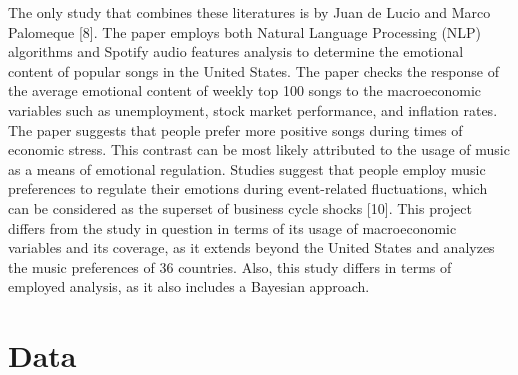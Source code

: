 \documentclass[12pt]{article}
\begin{document}
The only study that combines these literatures is by Juan de Lucio and Marco Palomeque [8]. The paper employs both Natural Language Processing (NLP) algorithms and Spotify audio features analysis to determine the emotional content of popular songs in the United States. The paper checks the response of the average emotional content of weekly top 100 songs to the macroeconomic variables such as unemployment, stock market performance, and inflation rates. The paper suggests that people prefer more positive songs during times of economic stress. This contrast can be most likely attributed to the usage of music as a means of emotional regulation. Studies suggest that people employ music preferences to regulate their emotions during event-related fluctuations, which can be considered as the superset of business cycle shocks [10]. This project differs from the study in question in terms of its usage of macroeconomic variables and its coverage, as it extends beyond the United States and analyzes the music preferences of 36 countries. Also, this study differs in terms of employed analysis, as it also includes a Bayesian approach.

\section{Data}
\end{document}

